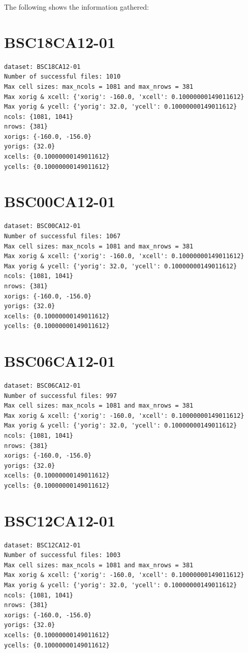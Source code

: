 \documentclass[
  letterpaper,
  DIV=11,
  numbers=noendperiod]{scrreprt}
\begin{document}
The following shows the information gathered:

\section{BSC18CA12-01}

\begin{verbatim}
dataset: BSC18CA12-01
Number of successful files: 1010
Max cell sizes: max_ncols = 1081 and max_nrows = 381
Max xorig & xcell: {'xorig': -160.0, 'xcell': 0.10000000149011612}
Max yorig & ycell: {'yorig': 32.0, 'ycell': 0.10000000149011612}
ncols: {1081, 1041}
nrows: {381}
xorigs: {-160.0, -156.0}
yorigs: {32.0}
xcells: {0.10000000149011612}
ycells: {0.10000000149011612}
\end{verbatim}

\section{BSC00CA12-01}

\begin{verbatim}
dataset: BSC00CA12-01
Number of successful files: 1067
Max cell sizes: max_ncols = 1081 and max_nrows = 381
Max xorig & xcell: {'xorig': -160.0, 'xcell': 0.10000000149011612}
Max yorig & ycell: {'yorig': 32.0, 'ycell': 0.10000000149011612}
ncols: {1081, 1041}
nrows: {381}
xorigs: {-160.0, -156.0}
yorigs: {32.0}
xcells: {0.10000000149011612}
ycells: {0.10000000149011612}
\end{verbatim}

\section{BSC06CA12-01}

\begin{verbatim}
dataset: BSC06CA12-01
Number of successful files: 997
Max cell sizes: max_ncols = 1081 and max_nrows = 381
Max xorig & xcell: {'xorig': -160.0, 'xcell': 0.10000000149011612}
Max yorig & ycell: {'yorig': 32.0, 'ycell': 0.10000000149011612}
ncols: {1081, 1041}
nrows: {381}
xorigs: {-160.0, -156.0}
yorigs: {32.0}
xcells: {0.10000000149011612}
ycells: {0.10000000149011612}
\end{verbatim}

\section{BSC12CA12-01}

\begin{verbatim}
dataset: BSC12CA12-01
Number of successful files: 1003
Max cell sizes: max_ncols = 1081 and max_nrows = 381
Max xorig & xcell: {'xorig': -160.0, 'xcell': 0.10000000149011612}
Max yorig & ycell: {'yorig': 32.0, 'ycell': 0.10000000149011612}
ncols: {1081, 1041}
nrows: {381}
xorigs: {-160.0, -156.0}
yorigs: {32.0}
xcells: {0.10000000149011612}
ycells: {0.10000000149011612}
\end{verbatim}
\end{document}
